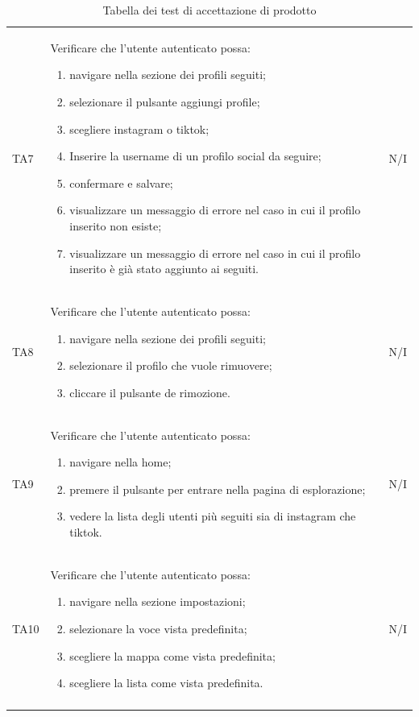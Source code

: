 {\begin{longtable}{C{.1\freewidth} C{.80\freewidth} C{.1\freewidth}}
    TA7 & Verificare che l'utente autenticato possa:\begin{enumerate}
        \item navigare nella sezione dei profili seguiti;
        \item selezionare il pulsante aggiungi profile;
        \item scegliere instagram o tiktok;
        \item Inserire la username di un profilo social da seguire;
        \item confermare e salvare;
        \item visualizzare un messaggio di errore nel caso in cui il profilo inserito non esiste;
        \item visualizzare un messaggio di errore nel caso in cui il profilo inserito è già stato aggiunto ai seguiti.
    \end{enumerate} & N/I  \\

    TA8 & Verificare che l'utente autenticato possa:\begin{enumerate}
        \item navigare nella sezione dei profili seguiti;
        \item selezionare il profilo che vuole rimuovere;
        \item cliccare il pulsante de rimozione.
    \end{enumerate} & N/I  \\

    TA9 & Verificare che l'utente autenticato possa:\begin{enumerate}
        \item navigare nella home;
        \item premere il pulsante per entrare nella pagina di esplorazione;
        \item vedere la lista degli utenti più seguiti sia di instagram che tiktok.
    \end{enumerate} & N/I  \\

    TA10 & Verificare che l'utente autenticato possa:\begin{enumerate}
        \item navigare nella sezione impostazioni;
        \item selezionare la voce vista predefinita;
        \item scegliere la mappa come vista predefinita;
        \item scegliere la lista come vista predefinita.
    \end{enumerate} & N/I \\

\bottomrule
{}
\caption{Tabella dei test di accettazione di prodotto}
\end{longtable}
} 

